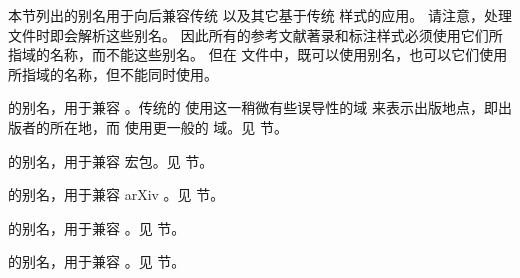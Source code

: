 本节列出的别名用于向后兼容传统 \BibTeX 以及其它基于传统 \BibTeX 样式的应用。
请注意，处理  文件时即会解析这些别名。
因此所有的参考文献著录和标注样式必须使用它们所指域的名称，而不能这些别名。
但在  文件中，既可以使用别名，也可以它们使用所指域的名称，但不能同时使用。


\begin{fieldlist}


 的别名，用于兼容 \BibTeX 。传统的 \BibTeX 使用这一稍微有些误导性的域  来表示出版地点，即出版者的所在地，而 \biblatex 使用更一般的  域。见  节。


 的别名，用于兼容  宏包。见  节。


 的别名，用于兼容 arXiv 。见  节。


 的别名，用于兼容 \BibTeX 。见  节。



 的别名，用于兼容 \BibTeX 。见  节。




\end{fieldlist}
